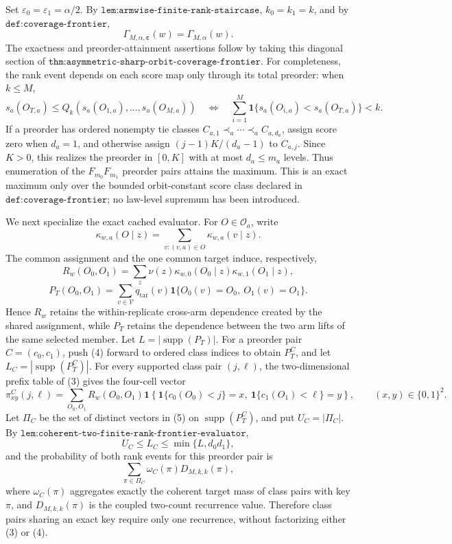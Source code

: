 Set \(\varepsilon_0=\varepsilon_1=\alpha/2\). By \(\texttt{lem:armwise-finite-rank-staircase}\), \(k_0=k_1=k\), and by \(\texttt{def:coverage-frontier}\),
\[
\Gamma_{M,\alpha,\boldsymbol\varepsilon}(w)=\Gamma_{M,\alpha}(w). \tag{1}
\]
The exactness and preorder-attainment assertions follow by taking this diagonal section of \(\texttt{thm:asymmetric-sharp-orbit-coverage-frontier}\). For completeness, the rank event depends on each score map only through its total preorder: when \(k\le M\),
\[
s_a(O_{T,a})\le Q_k(s_a(O_{1,a}),\ldots,s_a(O_{M,a}))
\quad\Longleftrightarrow\quad
\sum_{i=1}^M\mathbf 1\{s_a(O_{i,a})<s_a(O_{T,a})\}<k. \tag{2}
\]
If a preorder has ordered nonempty tie classes \(C_{a,1}\prec_a\cdots\prec_a C_{a,d_a}\), assign score zero when \(d_a=1\), and otherwise assign \((j-1)K/(d_a-1)\) to \(C_{a,j}\). Since \(K>0\), this realizes the preorder in \([0,K]\) with at most \(d_a\le m_a\) levels. Thus enumeration of the \(F_{m_0}F_{m_1}\) preorder pairs attains the maximum. This is an exact maximum only over the bounded orbit-constant score class declared in \(\texttt{def:coverage-frontier}\); no law-level supremum has been introduced.

We next specialize the exact cached evaluator. For \(O\in\mathcal O_a\), write
\[
\kappa_{w,a}(O\mid z)=\sum_{v:(v,a)\in O}\kappa_{w,a}(v\mid z).
\]
The common assignment and the one common target induce, respectively,
\[
R_w(O_0,O_1)=\sum_z\nu(z)\kappa_{w,0}(O_0\mid z)\kappa_{w,1}(O_1\mid z), \tag{3}
\]
\[
P_T(O_0,O_1)=\sum_{v\in\mathcal V}q_{\mathrm{tar}}(v)\mathbf 1\{O_0(v)=O_0,\ O_1(v)=O_1\}. \tag{4}
\]
Hence \(R_w\) retains the within-replicate cross-arm dependence created by the shared assignment, while \(P_T\) retains the dependence between the two arm lifts of the same selected member. Let \(L=|\operatorname{supp}(P_T)|\). For a preorder pair \(C=(c_0,c_1)\), push (4) forward to ordered class indices to obtain \(P_T^C\), and let \(L_C=|\operatorname{supp}(P_T^C)|\). For every supported class pair \((j,\ell)\), the two-dimensional prefix table of (3) gives the four-cell vector
\[
\pi^C_{xy}(j,\ell)=\sum_{O_0,O_1}R_w(O_0,O_1)\mathbf 1\!\left\{\mathbf 1\{c_0(O_0)<j\}=x,\ \mathbf 1\{c_1(O_1)<\ell\}=y\right\},
\qquad (x,y)\in\{0,1\}^2. \tag{5}
\]
Let \(\Pi_C\) be the set of distinct vectors in (5) on \(\operatorname{supp}(P_T^C)\), and put \(U_C=|\Pi_C|\). By \(\texttt{lem:coherent-two-finite-rank-frontier-evaluator}\),
\[
U_C\le L_C\le\min\{L,d_0d_1\}, \tag{6}
\]
and the probability of both rank events for this preorder pair is
\[
\sum_{\pi\in\Pi_C}\omega_C(\pi)D_{M,k,k}(\pi), \tag{7}
\]
where \(\omega_C(\pi)\) aggregates exactly the coherent target mass of class pairs with key \(\pi\), and \(D_{M,k,k}(\pi)\) is the coupled two-count recurrence value. Therefore class pairs sharing an exact key require only one recurrence, without factorizing either (3) or (4).

